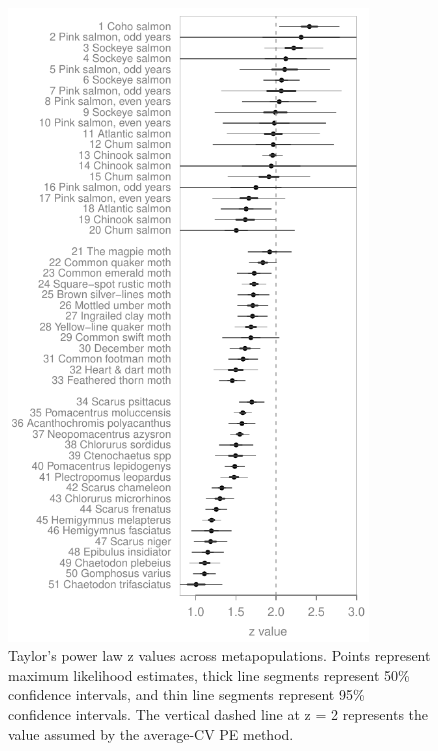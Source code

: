 \begin{figure}[htbp]
  \centering
  \includegraphics[height=6.6in]{prophets/Taylor_z_values.pdf}
  \caption{
    Taylor's power law z values across metapopulations. Points represent maximum
    likelihood estimates, thick line segments represent 50\% confidence
    intervals, and thin line segments represent 95\% confidence intervals. The
    vertical dashed line at z = 2 represents the value assumed by the average-CV
    PE method.
}
\label{fig:z-vals}
\end{figure}

